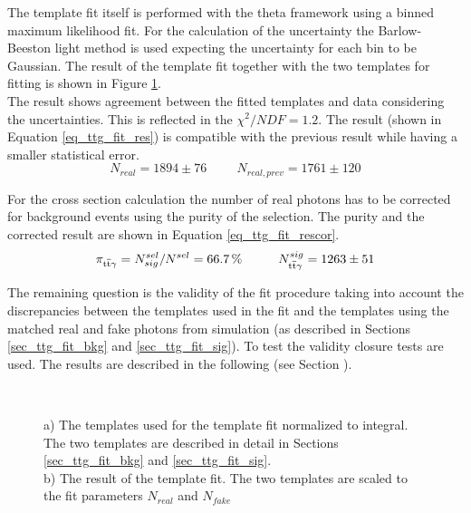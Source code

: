 The template fit itself is performed with the theta framework \cite{theta} using a binned maximum likelihood fit. For the calculation of the uncertainty the Barlow-Beeston light method is used \cite{Barlow:1993dm} \cite{2011arXiv1103.0354C} expecting the uncertainty for each bin to be Gaussian. The result of the template fit together with the two templates for fitting is shown in Figure \ref{fig_ttg_fit_res}.\\
The result shows agreement between the fitted templates and data considering the uncertainties. This is  reflected in the $\chi^2 / NDF = 1.2$. The result (shown in Equation \ref{eq_ttg_fit_res}) is compatible with the previous result \cite{CMS-PAS-TOP-13-011} while having a smaller statistical error. \\

\begin{equation}
N_{real} = 1894 \pm 76 \hspace{1cm} N_{real,prev} = 1761 \pm 120
\label{eq_ttg_fit_res}
\end{equation}

For the cross section calculation the number of real photons has to be corrected for background events using the purity of the selection.
The purity and the corrected result are shown in Equation \ref{eq_ttg_fit_rescor}.\\

\begin{equation}
\pi_{\mathrm{t}\overline{\mathrm{t}} \gamma} = N^{sel}_{sig} / N^{sel} = \SI{66.7}{\percent} \hspace{1cm} N^{sig}_{\mathrm{t}\overline{\mathrm{t}} \gamma} = 1263 \pm 51
\label{eq_ttg_fit_rescor}
\end{equation}

The remaining question is the validity of the fit procedure taking into account the discrepancies between the templates used in the fit and the templates using the matched real and fake photons from simulation (as described in Sections \ref{sec_ttg_fit_bkg} and \ref{sec_ttg_fit_sig}). To test the validity closure tests are used. The results are described in the following (see Section ).

\begin{figure}[ht]
  \\
  \caption{a) The templates used for the template fit normalized to integral. The two templates are described in detail in Sections \ref{sec_ttg_fit_bkg} and \ref{sec_ttg_fit_sig}.\\ b) The result of the template fit. The two templates are scaled to the fit parameters $N_{real}$ and $N_{fake}$}
  \label{fig_ttg_fit_res}
\end{figure}

